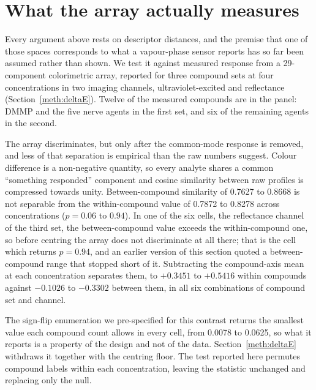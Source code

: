 \documentclass[11pt,a4paper]{article}
\begin{document}
\section{What the array actually measures}
\label{res:arraydetail}

Every argument above rests on descriptor distances, and the premise that one of
those spaces corresponds to what a vapour-phase sensor reports has so far been
assumed rather than shown. We test it against measured response from a
29-component colorimetric array, reported for three compound sets at four
concentrations in two imaging channels, ultraviolet-excited and reflectance
(Section~\ref{meth:deltaE}). Twelve of the measured compounds are in the panel:
DMMP and the five nerve agents in the first set, and six of the remaining agents
in the second.

The array discriminates, but only after the common-mode response is removed, and
less of that separation is empirical than the raw numbers suggest. Colour
difference is a non-negative quantity, so every analyte shares a common
``something responded'' component and cosine similarity between raw profiles is
compressed towards unity. Between-compound similarity of 0.7627 to 0.8668 is not
separable from the within-compound value of 0.7872 to 0.8278 across concentrations
($p = 0.06$ to $0.94$). In one of the six cells, the reflectance channel of the
third set, the between-compound value exceeds the within-compound one, so before
centring the array does not discriminate at all there; that is the cell which
returns $p = 0.94$, and an earlier version of this section quoted a
between-compound range that stopped short of it. Subtracting the compound-axis mean at each concentration
separates them, to $+0.3451$ to $+0.5416$ within compounds against $-0.1026$ to
$-0.3302$ between them, in all six combinations of compound set and channel.

The sign-flip enumeration we pre-specified for this contrast returns the
smallest value each compound count allows in every cell, from 0.0078 to 0.0625,
so what it reports is a property of the design and not of the data.
Section~\ref{meth:deltaE} withdraws it together with the centring floor. The
test reported here permutes compound labels within each concentration, leaving
the statistic unchanged and replacing only the null.

\begin{table}[!htb]
\centering
\caption{Premise test under the label-permutation null. The statistic is the
mean over compounds of (agreement with itself across concentrations) minus
(agreement with the other compounds' consensus patterns). Fixing the first
concentration's labels leaves $(n!)^{C-1}$ distinct relabellings, which is
enumerable for the four-compound set and sampled for the others.}
\label{tab:premisenull}

\end{table}
\end{document}
